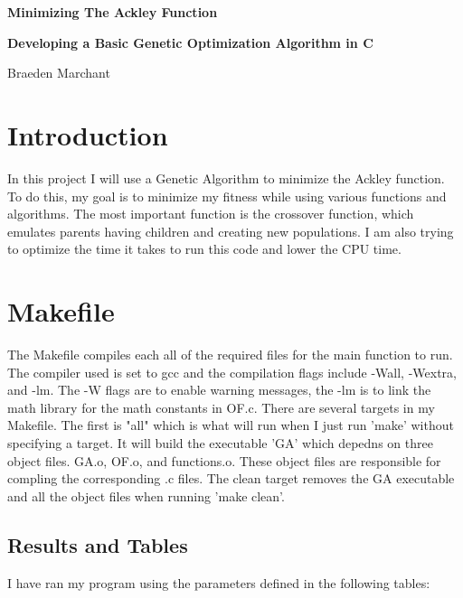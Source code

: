 \documentclass[12pt]{article}
\begin{document}
	
	\justifying
	
	\begin{center}
		\textbf{{\large Minimizing The Ackley Function}}
		
		\textbf{Developing a Basic Genetic Optimization Algorithm in C} 
		
		Braeden Marchant
	\end{center}
	

	
	
	
	\section{Introduction}
	In this project I will use a Genetic Algorithm to minimize the Ackley function. To do this, my goal is to minimize my fitness while using various functions and algorithms. The most important function is the crossover function, which emulates parents having children and creating new populations. I am also trying to optimize the time it takes to run this code and lower the CPU time.
	
	\section{Makefile}

    The Makefile compiles each all of the required files for the main function to run.
    The compiler used is set to gcc and the compilation flags include -Wall, -Wextra, and -lm. The -W flags are to enable warning messages, the -lm is to link the math library for the math constants in OF.c. 
    There are several targets in my Makefile. The first is "all" which is what will run when I just run 'make' without specifying a target. It will build the executable 'GA' which depedns on three object files. GA.o, OF.o, and functions.o.
    These object files are responsible for compling the corresponding .c files.
    The clean target removes the GA executable and all the object files when running 'make clean'.

	\subsection{Results and Tables}
	
	I have ran my program using the parameters defined in the following tables:
\end{document}
